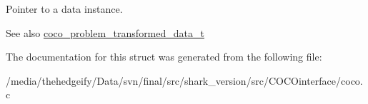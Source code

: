 Pointer to a data instance. 

\begin{DoxySeeAlso}{See also}
\hyperlink{structcoco__problem__transformed__data__t}{coco\+\_\+problem\+\_\+transformed\+\_\+data\+\_\+t} 
\end{DoxySeeAlso}


The documentation for this struct was generated from the following file\+:\begin{DoxyCompactItemize}
\item 
/media/thehedgeify/\+Data/svn/final/src/shark\+\_\+version/src/\+C\+O\+C\+Ointerface/coco.\+c\end{DoxyCompactItemize}
